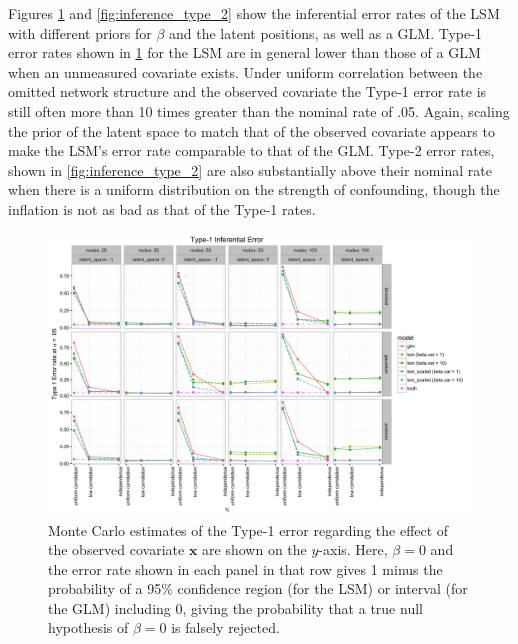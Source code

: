 \documentclass[11pt]{article}
\begin{document}
Figures \ref{fig:inference_type_1} and \ref{fig:inference_type_2} show the inferential error rates of the LSM with different priors for $\beta$ and the latent positions, as well as a GLM. Type-1 error rates shown in \ref{fig:inference_type_1} for the LSM are in general lower than those of a GLM when an unmeasured covariate exists. Under uniform correlation between the omitted network structure and the observed covariate the Type-1 error rate is still often more than 10 times greater than the nominal rate of .05. Again, scaling the prior of the latent space to match that of the observed covariate appears to make the LSM's error rate comparable to that of the GLM. Type-2 error rates, shown in \ref{fig:inference_type_2} are also substantially above their nominal rate when there is a uniform distribution on the strength of confounding, though the inflation is not as bad as that of the Type-1 rates.

\begin{figure}
\includegraphics[width=\textwidth]{inference_type_1.png}
\caption{Monte Carlo estimates of the Type-1 error regarding the effect of the observed covariate $\mathbf{x}$ are shown on the $y$-axis. Here, $\beta = 0$ and the error rate shown in each panel in that row gives 1 minus the probability of a 95\% confidence region (for the LSM) or interval (for the GLM) including $0$, giving the probability that a true null hypothesis of $\beta = 0$ is falsely rejected. \label{fig:inference_type_1}}
\end{figure}
\end{document}
